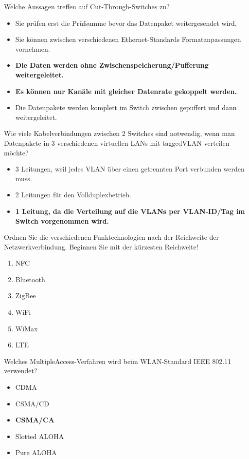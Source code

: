 \documentclass{article}
\begin{document}
	Welche Aussagen treffen auf Cut-Through-Switches zu? 
	\begin{itemize}
		\item Sie prüfen erst die Prüfsumme bevor das Datenpaket weitergesendet wird.
		\item Sie können zwischen verschiedenen Ethernet-Standards Formatanpassungen vornehmen.
		\item \textbf{Die Daten werden ohne Zwischenspeicherung/Pufferung weitergeleitet.}
		\item \textbf{Es können nur Kanäle mit gleicher Datenrate gekoppelt werden.}
		\item Die Datenpakete werden komplett im Switch zwischen gepuffert und dann weitergeleitet.
	\end{itemize}

	Wie viele Kabelverbindungen zwischen 2 Switches sind notwendig, wenn man Datenpakete in 3 verschiedenen virtuellen LANs mit taggedVLAN verteilen möchte? 
	\begin{itemize}
		\item 3 Leitungen, weil jedes VLAN über einen getrennten Port verbunden werden muss.
		\item 2 Leitungen für den Vollduplexbetrieb.
		\item \textbf{1 Leitung, da die Verteilung auf die VLANs per VLAN-ID/Tag im Switch vorgenommen wird.} 
	\end{itemize}

	Ordnen Sie die verschiedenen Funktechnologien nach der Reichweite der Netzwerkverbindung. Beginnen Sie mit der kürzesten Reichweite! 
	\begin{enumerate}
		\item NFC
		\item Bluetooth
		\item ZigBee
		\item WiFi
		\item WiMax
		\item LTE
	\end{enumerate}

	Welches MultipleAccess-Verfahren wird beim WLAN-Standard IEEE 802.11 verwendet? 
	\begin{itemize}
		\item CDMA
		\item CSMA/CD
		\item \textbf{CSMA/CA}
		\item Slotted ALOHA
		\item Pure ALOHA
	\end{itemize}
\end{document}
